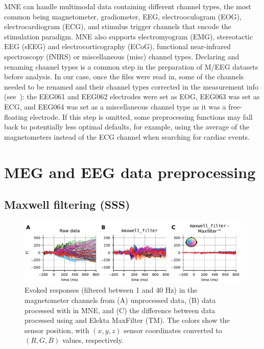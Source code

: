 MNE can handle multimodal data containing different channel types, the most common being magnetometer, gradiometer, EEG, electrooculogram (EOG), electrocardiogram (ECG), and stimulus trigger channels that encode the stimulation paradigm. MNE also supports electromyogram (EMG), stereotactic EEG (sEEG) and electrocorticography (ECoG), functional near-infrared spectroscopy (fNIRS) or miscellaneous (misc) channel types. Declaring and renaming channel types is a common step in the preparation of M/EEG datasets before analysis. In our case, once the files were read in, some of the channels needed to be renamed and their channel types corrected in the measurement info (see~\citep{wakeman2015multi}): the EEG061 and EEG062 electrodes were set as EOG, EEG063 was set as ECG, and EEG064 was set as a miscellaneous channel type as it was a free-floating electrode. If this step is omitted, some preprocessing functions may fall back to potentially less optimal defaults, for example, using the average of the magnetometers instead of the ECG channel when searching for cardiac events.

\section{MEG and EEG data preprocessing}

\subsection{Maxwell filtering (SSS)}
\label{sec:maxfilter}

\begin{figure}[htb]
        \centering
        \includegraphics{figures/Maxfilter.pdf}
        \caption[Comparison of Elekta MaxFilter (TM) and MNE implementation]{Evoked responses (filtered between 1 and 40 Hz) in the magnetometer channels from (A) unprocessed data, (B) data processed with  in MNE, and (C) the difference between data processed using  and Elekta MaxFilter (TM). The colors show the sensor position, with $(x, y, z)$ sensor coordinates converted to $(R, G, B)$ values, respectively.}
        \label{fig:fig_maxwell}
\end{figure}

